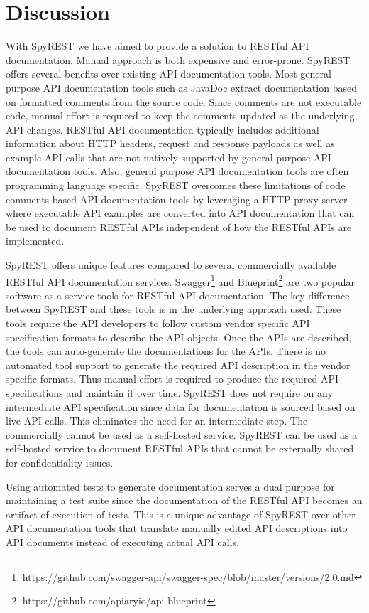 \documentclass[conference]{IEEEtran}
\begin{document}
\section{Discussion}
With SpyREST we have aimed to provide a solution to RESTful API documentation. Manual approach is both expensive and error-prone. SpyREST offers several benefits over existing API documentation tools. Most general purpose API documentation tools such as JavaDoc extract documentation based on formatted comments from the source code. Since comments are not executable code, manual effort is required to keep the comments updated as the underlying API changes. RESTful API documentation typically includes additional information about HTTP headers, request and response payloads as well as example API calls that are not natively supported by general purpose API documentation tools. Also, general purpose API documentation tools are often programming language specific. SpyREST overcomes these limitations of code comments based API documentation tools by leveraging a HTTP proxy server where executable API examples are converted into API documentation that can be used to document RESTful APIs independent of how the RESTful APIs are implemented.

SpyREST offers unique features compared to several commercially available RESTful API documentation services. Swagger\footnote{https://github.com/swagger-api/swagger-spec/blob/master/versions/2.0.md} and Blueprint\footnote{https://github.com/apiaryio/api-blueprint} are two popular software as a service tools for RESTful API documentation. The key difference between SpyREST and these tools is in the underlying approach used. These tools require the API developers to follow custom vendor specific API specification formats to describe the API objects. Once the APIs are described, the tools can auto-generate the documentations for the APIs. There is no automated tool support to generate the required API description in the vendor specific formats. Thus manual effort is required to produce the required API specifications and maintain it over time. SpyREST does not require on any intermediate API specification since data for documentation is sourced based on live API calls. This eliminates the need for an intermediate step. The commercially cannot be used as a self-hosted service. SpyREST can be used as a self-hosted service to document RESTful APIs that cannot be externally shared for confidentiality issues.

Using automated tests to generate documentation serves a dual purpose for maintaining a test suite since the documentation of the RESTful API becomes an artifact of execution of tests. This is a unique advantage of SpyREST over other API documentation tools that translate manually edited API descriptions into API documents instead of executing actual API calls.
\end{document}

